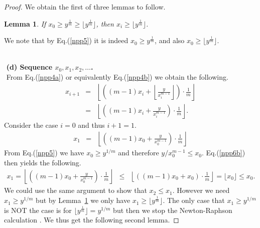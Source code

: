 \documentclass[11pt]{article}
\newtheorem{lem}{Lemma}
\newcommand{\floor}[1]{\lfloor #1 \rfloor}
\begin{document}
\begin{proof}
\noindent
We obtain the first of three lemmas to follow.
\begin{lem}
\label{lemn1}
If $x_0 \geq y^{\frac{1}{m}} \geq
\floor{ y^{\frac{1}{m}} }$,
then $x_i \geq \floor{ y^{\frac{1}{m}} }$.
\end{lem}
We note that by Eq.(\ref{npp5}) it is 
indeed $x_0 \geq y^{\frac{1}{m}}$,
and also $x_0 \geq  \floor{y^{\frac{1}{m}}}$.

%
%
%
$ $ \\ $ $
{\bf (d) Sequence $x_0 , x_1 , x_2 , \ldots $.}
$ $ \\ $ $
From Eq.(\ref{npp4a}) or equivalently Eq.(\ref{npp4b})
we obtain the following.
\begin{eqnarray}
\label{npp6ab}
x_{i+1}
&=&
  \left\lfloor
     \left( (m-1) x_i +   \left\lfloor
                          \frac{y}{x_i^{m-1}}
                          \right\rfloor
     \right) \cdot  \frac{1}{m}
  \right\rfloor  \\
&=&
\label{npp6ba}
  \left\lfloor
     \left( (m-1) x_i +
                          \frac{y}{x_i^{m-1}}
     \right) \cdot  \frac{1}{m}
  \right\rfloor .
\end{eqnarray}
Consider the case $i=0$ and thus $i+1 =1$.
\begin{eqnarray}
x_{1}
&=&
\label{npp6b}
  \left\lfloor
     \left( (m-1) x_0 +
                          \frac{y}{x_0^{m-1}}
     \right) \cdot  \frac{1}{m}
  \right\rfloor
\end{eqnarray}
From Eq.(\ref{npp5}) we have $x_0 \geq y^{1/m}$
and therefore $y/ x_0^{m-1} \leq x_0$.
Eq.(\ref{npp6b}) then yields the following.
\begin{eqnarray}
x_{1}
=
\label{npp6c}
  \left\lfloor
     \left( (m-1) x_0 +
                          \frac{y}{x_0^{m-1}}
     \right) \cdot  \frac{1}{m}
  \right\rfloor
   &\leq &
  \left\lfloor
     \left( \left( m-1 \right) x_0 +  x_0
     \right) \cdot  \frac{1}{m}
  \right\rfloor   = \floor{ x_0 } \leq x_0.
\end{eqnarray}
We could use the same argument to show that $x_2 \leq x_1 $.
However we need
$x_1 \geq y^{1/m}$ but by Lemma~\ref{lemn1}
we only have
$x_1 \geq \floor{ y^{\frac{1}{m}} }$.
The only case that $x_1 \geq y^{1/m}$ is NOT the case
is for $ \floor{ y^{\frac{1}{m}} } = y^{1/m}$ but then
we stop the Newton-Raphson calculation .
We thus get the following second lemma.



\end{proof}
\end{document}
